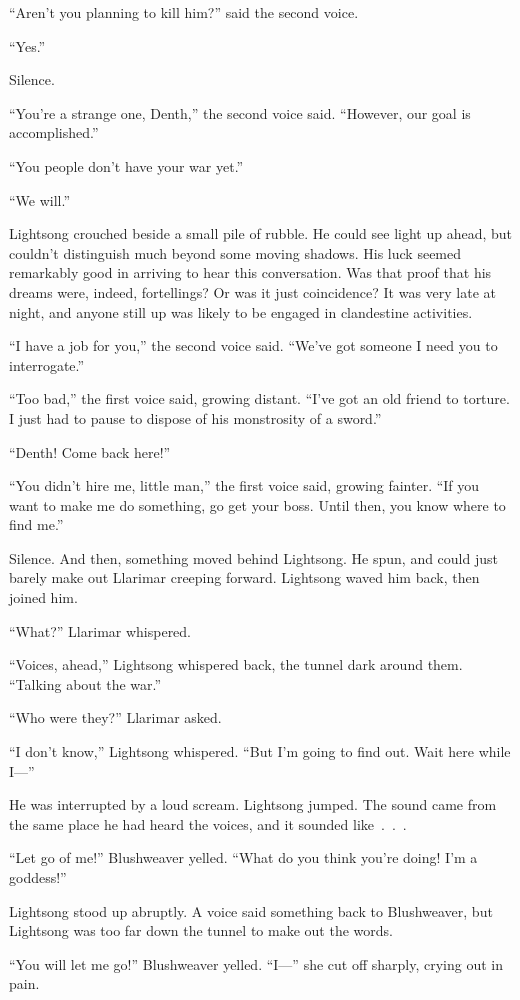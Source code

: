 “Aren’t you planning to kill him?” said the second voice.

“Yes.”

Silence.

“You’re a strange one, Denth,” the second voice said. “However, our goal is accomplished.”

“You people don’t have your war yet.”

“We will.”

Lightsong crouched beside a small pile of rubble. He could see light up ahead, but couldn’t distinguish much beyond some moving shadows. His luck seemed remarkably good in arriving to hear this conversation. Was that proof that his dreams were, indeed, fortellings? Or was it just coincidence? It was very late at night, and anyone still up was likely to be engaged in clandestine activities.

“I have a job for you,” the second voice said. “We’ve got someone I need you to interrogate.”

“Too bad,” the first voice said, growing distant. “I’ve got an old friend to torture. I just had to pause to dispose of his monstrosity of a sword.”

“Denth! Come back here!”

“You didn’t hire me, little man,” the first voice said, growing fainter. “If you want to make me do something, go get your boss. Until then, you know where to find me.”

Silence. And then, something moved behind Lightsong. He spun, and could just barely make out Llarimar creeping forward. Lightsong waved him back, then joined him.

“What?” Llarimar whispered.

“Voices, ahead,” Lightsong whispered back, the tunnel dark around them. “Talking about the war.”

“Who were they?” Llarimar asked.

“I don’t know,” Lightsong whispered. “But I’m going to find out. Wait here while I—”

He was interrupted by a loud scream. Lightsong jumped. The sound came from the same place he had heard the voices, and it sounded like~.~.~.

“Let go of me!” Blushweaver yelled. “What do you think you’re doing! I’m a goddess!”

Lightsong stood up abruptly. A voice said something back to Blushweaver, but Lightsong was too far down the tunnel to make out the words.

“You will let me go!” Blushweaver yelled. “I—” she cut off sharply, crying out in pain.

